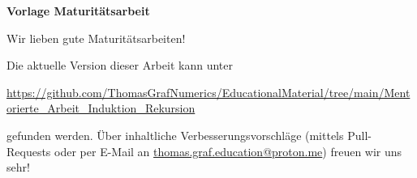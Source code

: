 \begin{titlepage}
	\thispagestyle{empty}
	\begin{center}
		\vspace*{1cm}

		{\Huge
			\textbf{Vorlage Maturitätsarbeit}

			\vspace{0.5cm}
			\LARGE
			Wir lieben gute Maturitätsarbeiten!

			\vspace{1.5cm}

			\textbf{}
		}
		\vfill
		\clearpage
		\thispagestyle{empty}
		\mbox{}
		\vfill
		{\Large }

		\noindent
		Die aktuelle Version dieser Arbeit kann unter
		\begin{center}
			{\footnotesize
				\url{https://github.com/ThomasGrafNumerics/EducationalMaterial/tree/main/Mentorierte_Arbeit_Induktion_Rekursion}
			}
		\end{center}
		gefunden werden. Über inhaltliche Verbesserungsvorschläge (mittels Pull-Requests oder per E-Mail an \href{mailto:thomas.graf.education@proton.me}{thomas.graf.education@proton.me}) freuen wir uns sehr!
		\vspace{0.8cm}
	\end{center}
\end{titlepage}
